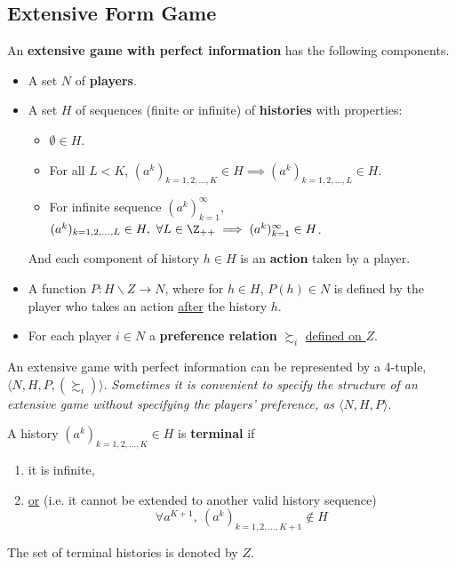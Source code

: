 \documentclass[11pt]{article}
\begin{document}
		\subsection{Extensive Form Game}
			\begin{definition}[89.1]
				An \textbf{extensive game with perfect information} has the following components.
				\begin{itemize}
					\item A set $N$ of \textbf{players}.
					\item A set $H$ of sequences (finite or infinite) of \textbf{histories} with properties:
						\begin{itemize}
							\item $\emptyset \in H$.
							\item For all $L < K$, $(a^k)_{k=1,2,\dots,K} \in H \implies (a^k)_{k=1,2,\dots,L} \in H$.
							\item For infinite sequence $(a^k)_{k=1}^\infty$,\\ $(a^k)_{k=1,2,\dots,L} \in H,\ \forall L \in \Z_{++} \implies (a^k)_{k=1}^\infty \in H$.
						\end{itemize} And each component of history $h \in H$ is an \textbf{action} taken by a player.
					\item A function $P: H \backslash Z \to N$, where for $h \in H$, $P(h) \in N$ is defined by the player who takes an action \ul{after} the history $h$.
					\item For each player $i \in N$ a \textbf{preference relation} $\succsim_i$ \ul{defined on $Z$}.
				\end{itemize}
			\end{definition}
			
			\begin{notation}[pg.90]
				An extensive game with perfect information can be represented by a 4-tuple, $\langle N, H, P, (\succsim_i) \rangle$. \emph{Sometimes it is convenient to specify the structure of an extensive game without specifying the players' preference, as $\langle N, H, P \rangle$}.
			\end{notation}
			
			\begin{definition}[pg.90]
				A history $(a^k)_{k=1,2,\dots,K} \in H$ is \textbf{terminal} if
				\begin{enumerate}
					\item it is infinite,
					\item \ul{or} (i.e. it cannot be extended to another valid history sequence)
					\[
						\forall a^{K+1},\ (a^k)_{k=1,2,\dots,K+1} \notin H
					\]
				\end{enumerate}
				The set of terminal histories is denoted by $Z$.
			\end{definition}
			
\end{document}
